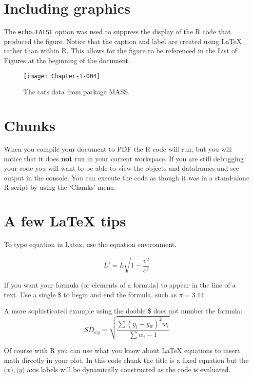 \section{Including graphics}
The \texttt{echo=FALSE} option was used to suppress the display of the R code that produced the figure.  Notice that the caption and label are created using \LaTeX{} rather than within R.  This allows for the figure to be referenced in the List of Figures at the beginning of the document. 

\begin{figure}[h]
\begin{center}
\texttt{[image: Chapter-1-004]}
  \caption{The cats data from package MASS.}
  \label{fig:cats}
\end{center}  
\end{figure}

\section{Chunks}

When you compile your document to PDF the R code will run, but you will notice that it does \textbf{not} run in your current workspace.  If you are still debugging your code you will want to be able to view the objects and dataframes and see output in the console.   You can execute the code as though it was in a stand-alone R script by using the `Chunks' menu.

\section{A few \LaTeX{} tips}

To type equation in Latex, use the equation environment.

\begin{equation}
     \label{simple_equation}
 L' = {L}{\sqrt{1-\frac{v^2}{c^2}}}
\end{equation}

If you want your formula (or elements of a formula) to appear in the line of a text. Use a single \$ to begin and end the formula, such as \label{sympi} $\pi = 3.14$

A more sophisticated example using the double \$ does not number the formula:
$$SD_{wy} = \sqrt{\dfrac{\sum(y_i-\bar{y}{_w})^2 w_i}{\sum w_i -1}}$$

Of course with R you can use what you know about \LaTeX{} equations to insert math directly in your plot. In this code chunk the title is a fixed equation but the $\bar(x),\bar(y)$ axis labels will be dynamically constructed as the code is evaluated.

